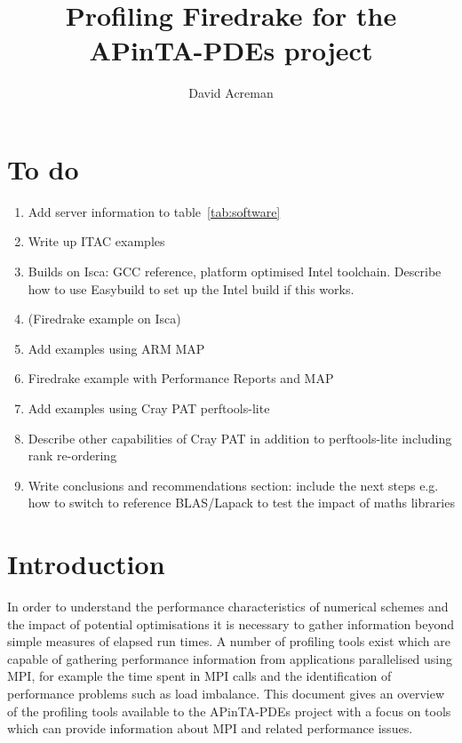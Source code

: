 \documentclass[a4paper,titlepage]{article}
\author{David Acreman}
\title{Profiling Firedrake for the APinTA-PDEs project}
\begin{document}
\pagestyle{fancy}
\lhead{}
\chead{}

\maketitle
\pagebreak
\tableofcontents
\pagebreak


\section*{To do}

\begin{enumerate}
\item Add server information to table~\ref{tab:software}
\item Write up ITAC examples
\item Builds on Isca: GCC reference, platform optimised Intel toolchain. Describe how to use Easybuild to set up the Intel build if this works.
\item (Firedrake example on Isca)
\item Add examples using ARM MAP
\item Firedrake example with Performance Reports and MAP
\item Add examples using Cray PAT perftools-lite
\item Describe other capabilities of Cray PAT in addition to perftools-lite including rank re-ordering
\item Write conclusions and recommendations section: include the next steps e.g. how to switch to reference BLAS/Lapack to test the impact of maths libraries
\end{enumerate}

\pagebreak


\section{Introduction}

In order to understand the performance characteristics of numerical schemes and the impact of potential optimisations it is necessary to gather information beyond simple measures of elapsed run times. A number of profiling tools exist which are capable of gathering performance information from applications parallelised using MPI, for example the time spent in MPI calls and the identification of performance problems such as load imbalance. This document gives an overview of the profiling tools available to the APinTA-PDEs project with a focus on tools which can provide information about MPI and related performance issues. 
\end{document}
